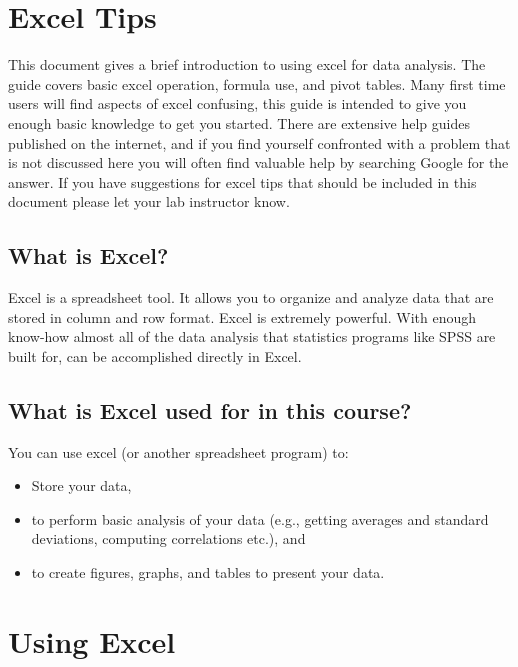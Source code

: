 
\section{Excel Tips}

This document gives a brief introduction to using excel for data analysis. The guide covers basic excel operation, formula use, and pivot tables. Many first time users will find aspects of excel confusing, this guide is intended to give you enough basic knowledge to get you started. There are extensive help guides published on the internet, and if you find yourself confronted with a problem that is not discussed here you will often find valuable help by searching Google for the answer. If you have suggestions for excel tips that should be included in this document please let your lab instructor know.

\subsection{What is Excel?}

Excel is a spreadsheet tool. It allows you to organize and analyze data that are stored in column and row format. Excel is extremely powerful. With enough know-how almost all of the data analysis that statistics programs like SPSS are built for, can be accomplished directly in Excel. 


\subsection{What is Excel used for in this course?}


You can use excel (or another spreadsheet program) to:


\begin{itemize} 

\item Store your data, 

\item to perform basic analysis of your data (e.g., getting averages and standard deviations, computing correlations etc.), and 

\item to create figures, graphs, and tables to present your data.
\end{itemize}


\section{Using Excel}


